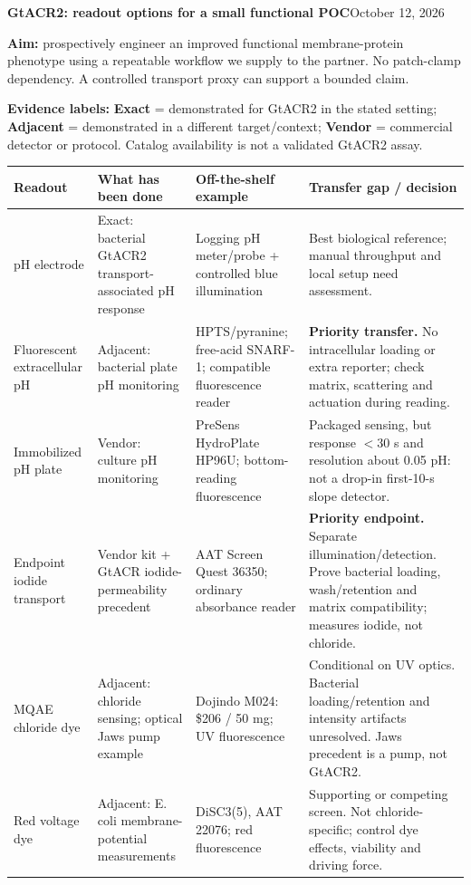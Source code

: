 \documentclass[10pt]{article}
\begin{document}
{\LARGE\bfseries\color{ink} GtACR2: readout options for a small functional POC}\hfill October 12, 2026

\textbf{Aim:} prospectively engineer an improved functional membrane-protein phenotype using a repeatable workflow we supply to the partner. No patch-clamp dependency. A controlled transport proxy can support a bounded claim.

\textbf{Evidence labels:} \textbf{Exact} = demonstrated for GtACR2 in the stated setting; \textbf{Adjacent} = demonstrated in a different target/context; \textbf{Vendor} = commercial detector or protocol. Catalog availability is not a validated GtACR2 assay.

\small
\begin{tabularx}{\linewidth}{@{}>{\raggedright\arraybackslash}p{1.2in}>{\raggedright\arraybackslash}p{1.65in}>{\raggedright\arraybackslash}p{1.65in}Y@{}}
\toprule
{}\textbf{Readout} & \textbf{What has been done} & \textbf{Off-the-shelf example} & \textbf{Transfer gap / decision} \\
\midrule
pH electrode & Exact: bacterial GtACR2 transport-associated pH response & Logging pH meter/probe + controlled blue illumination & Best biological reference; manual throughput and local setup need assessment. \\
Fluorescent extracellular pH & Adjacent: bacterial plate pH monitoring & HPTS/pyranine; free-acid SNARF-1; compatible fluorescence reader & \textbf{Priority transfer.} No intracellular loading or extra reporter; check matrix, scattering and actuation during reading. \\
Immobilized pH plate & Vendor: culture pH monitoring & PreSens HydroPlate HP96U; bottom-reading fluorescence & Packaged sensing, but response $<30$ s and resolution about 0.05 pH: not a drop-in first-10-s slope detector. \\
Endpoint iodide transport & Vendor kit + GtACR iodide-permeability precedent & AAT Screen Quest 36350; ordinary absorbance reader & \textbf{Priority endpoint.} Separate illumination/detection. Prove bacterial loading, wash/retention and matrix compatibility; measures iodide, not chloride. \\
MQAE chloride dye & Adjacent: chloride sensing; optical Jaws pump example & Dojindo M024: \$206 / 50 mg; UV fluorescence & Conditional on UV optics. Bacterial loading/retention and intensity artifacts unresolved. Jaws precedent is a pump, not GtACR2. \\
Red voltage dye & Adjacent: E. coli membrane-potential measurements & DiSC3(5), AAT 22076; red fluorescence & Supporting or competing screen. Not chloride-specific; control dye effects, viability and driving force. \\

\end{tabularx}
\end{document}
